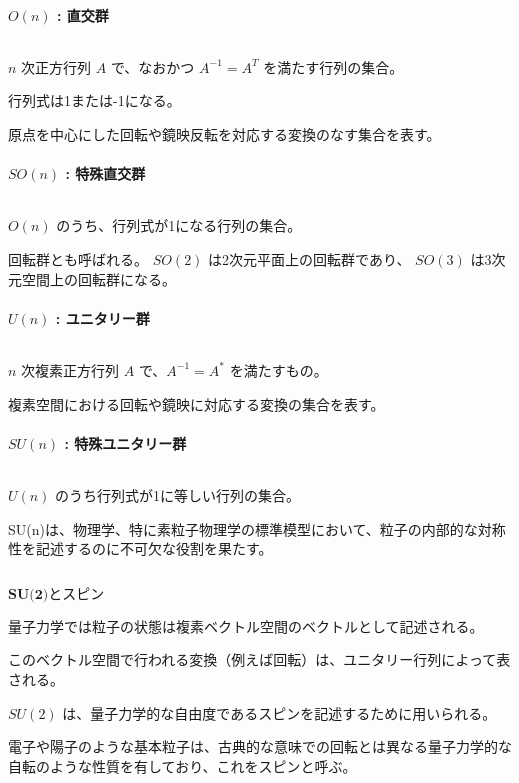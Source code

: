 \documentclass[uplatex,a4j,12pt,dvipdfmx]{jsarticle}
\begin{document}
\paragraph{$O(n)$ : 直交群}

${}$

$n$ 次正方行列 $A$ で、なおかつ $A^{-1} = A^{T}$ を満たす行列の集合。

行列式は1または-1になる。

原点を中心にした回転や鏡映反転を対応する変換のなす集合を表す。

\paragraph{$SO(n)$ : 特殊直交群}

${}$

$O(n)$ のうち、行列式が1になる行列の集合。

回転群とも呼ばれる。
$SO(2)$ は2次元平面上の回転群であり、
$SO(3)$ は3次元空間上の回転群になる。

\paragraph{$U(n)$ : ユニタリー群}

${}$

$n$ 次複素正方行列 $A$ で、$A^{-1} = A^{*}$ を満たすもの。

複素空間における回転や鏡映に対応する変換の集合を表す。

\paragraph{$SU(n)$ : 特殊ユニタリー群}

${}$

$U(n)$ のうち行列式が1に等しい行列の集合。

SU(n)は、物理学、特に素粒子物理学の標準模型において、粒子の内部的な対称性を記述するのに不可欠な役割を果たす。

${}$

$\textbf{SU(2)とスピン}$

量子力学では粒子の状態は複素ベクトル空間のベクトルとして記述される。

このベクトル空間で行われる変換（例えば回転）は、ユニタリー行列によって表される。

$SU(2)$ は、量子力学的な自由度であるスピンを記述するために用いられる。

電子や陽子のような基本粒子は、古典的な意味での回転とは異なる量子力学的な自転のような性質を有しており、これをスピンと呼ぶ。
\end{document}
